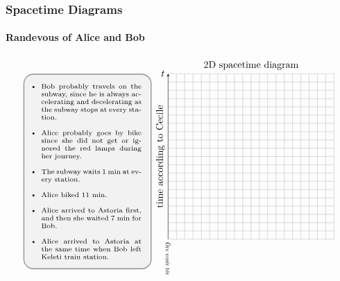 \documentclass[xcolor=x11names]{beamer}
\begin{document}
\begin{frame}
\frametitle{Spacetime Diagrams}
\framesubtitle{Randevous of Alice and Bob}
\vspace{-1cm}
\[\begin{tikzpicture}[>=stealth, scale=.6,
world/.style={inner sep=0, minimum size=.15cm, fill=black, circle},
intension/.style={rounded corners=10pt, fill=white!90!gray, fill opacity=1, draw=gray, thick, inner sep=10},
altrel/.style={->},
worldline/.style={line width=1mm, rounded corners=5, opacity=.5},
axis/.style={->},
felirat/.style={inner sep=5, scale=.6},
bejaras/.style={blue}]
\node at (5,10.5) {2D spacetime diagram};
\coordinate (O) at (0,0);
\coordinate (Y) at (0,10);
\coordinate (X) at (10,0);
\draw[axis]  (O) -- (Y) node[midway, above, sloped]{time according to Cecile};
\node[anchor=north] at (X) {};%
\node[anchor=east] at (Y) {$t$};
\draw [help lines, step=.5cm] (O) grid (10,10);
\node[anchor=north east, intension] at (-1,10) {\hspace{-.6cm}\begin{minipage}{4.5cm}
\scriptsize\begin{itemize}
\item Bob probably travels on the subway, since he is always accelerating and decelerating as the subway stops at every station.
\item Alice probably goes by bike since she did not get or ignored the red lamps during her journey.
\item The subway waits 1 min at every station.
\item Alice biked 11 min.
\item Alice arrived to Astoria first, and then she waited 7 min for Bob.
\item Alice arrived to Astoria at the same time when Bob left Keleti train station.
\end{itemize}
\end{minipage}};
\coordinate (B1) at (0,0) {};
\coordinate (B2) at (1,1.5) {} {};
\coordinate (B3) at (1,2) {} {};
\coordinate (B4) at (2,3.5) {} {};
\coordinate (B5) at (2,4) {} {};
\coordinate (B6) at (3,5.5) {} {};
\coordinate (B7) at (3,6) {} {};
\coordinate (B8) at (4,7.5) {} {};
\coordinate (B9) at (4,8) {} {};
\coordinate (B10) at (5,9.5) {} {};
\coordinate (B11) at (5,10) {} {};
\coordinate (C1) at (7,0.5) {} {};
\coordinate (C2) at (5,6) {} {};
\node [felirat, anchor=west, rotate=-90] at (0,0) {Örs vezér tér};

\end{tikzpicture}\]
\end{frame}
\end{document}

